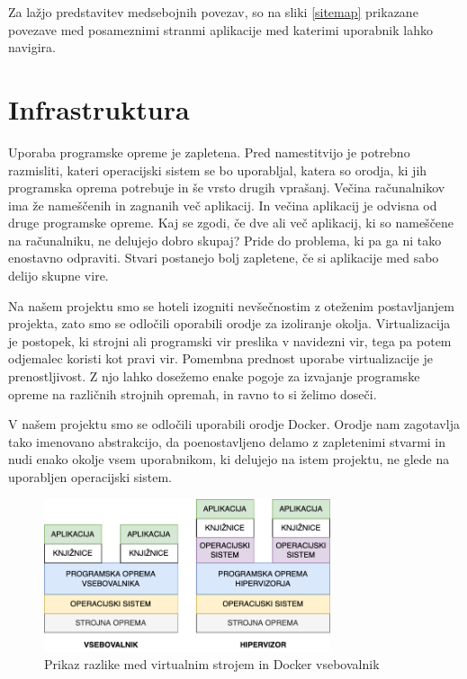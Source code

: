 \documentclass[a4paper, 12pt]{book}
\begin{document}
Za lažjo predstavitev medsebojnih povezav, so na sliki \ref{sitemap} prikazane povezave med posameznimi stranmi aplikacije med katerimi uporabnik lahko navigira.


\section{Infrastruktura}
Uporaba programske opreme je zapletena. Pred namestitvijo je potrebno razmisliti, kateri operacijski sistem se bo uporabljal, katera so orodja, ki jih programska oprema potrebuje in še vrsto drugih vprašanj. Večina računalnikov ima že nameščenih in zagnanih več aplikacij. In večina aplikacij je odvisna od druge programske opreme. Kaj se zgodi, če dve ali več aplikacij, ki so nameščene na računalniku, ne delujejo dobro skupaj? Pride do problema, ki pa ga ni tako enostavno odpraviti. Stvari postanejo bolj zapletene, če si aplikacije med sabo delijo skupne vire. 

Na našem projektu smo se hoteli izogniti nevšečnostim z oteženim postavljanjem projekta, zato smo se odločili oporabili orodje za izoliranje okolja. Virtualizacija je postopek, ki strojni ali programski vir preslika v navidezni vir, tega pa potem odjemalec koristi kot pravi vir. Pomembna prednost uporabe virtualizacije je prenostljivost. Z njo lahko dosežemo enake pogoje za izvajanje programske opreme na različnih strojnih opremah, in ravno to si želimo doseči.

V našem projektu smo se odločili uporabili orodje Docker. Orodje nam zagotavlja tako imenovano abstrakcijo, da poenostavljeno delamo z zapletenimi stvarmi in nudi enako okolje vsem uporabnikom, ki delujejo na istem projektu, ne glede na uporabljen operacijski sistem. 

\begin{figure}[h]
\begin{center}
\includegraphics[width=0.75\textwidth]{slike/docker-vs-vm.png}
\end{center}
\caption{ Prikaz razlike med virtualnim strojem in Docker vsebovalnik }
\label{docker-vs-vm}
\end{figure}
\end{document}
